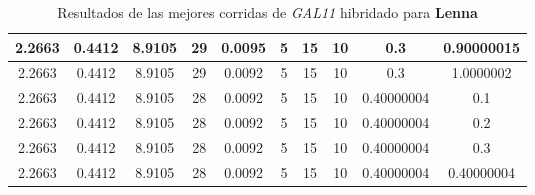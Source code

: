 \begin{table}[h!]
\begin{center}
\begin{tabular}{|c|c|c|c|c|c|c|c|c|c|}
        \hline
        \hline
            2.2663 & 0.4412  & 8.9105 & 29 & 0.0095 & 5 & 15 & 10 & 0.3 & 0.90000015\\
        \hline
        \hline
            2.2663 & 0.4412  & 8.9105 & 29 & 0.0092 & 5 & 15 & 10 & 0.3 & 1.0000002\\
        \hline
        \hline
            2.2663 & 0.4412  & 8.9105 & 28 & 0.0092 & 5 & 15 & 10 & 0.40000004 & 0.1\\
        \hline
        \hline
            2.2663 & 0.4412  & 8.9105 & 28 & 0.0092 & 5 & 15 & 10 & 0.40000004 & 0.2\\
        \hline
        \hline
            2.2663 & 0.4412  & 8.9105 & 28 & 0.0092 & 5 & 15 & 10 & 0.40000004 & 0.3\\
        \hline
        \hline
            2.2663 & 0.4412  & 8.9105 & 28 & 0.0092 & 5 & 15 & 10 & 0.40000004 & 0.40000004\\
        \hline
        \end{tabular}
        \caption{Resultados de las mejores corridas de \emph{GAL11} hibridado para {\bf Lenna}}
        \label{tb:tableGAL11}
    \end{center}
\end{table}
